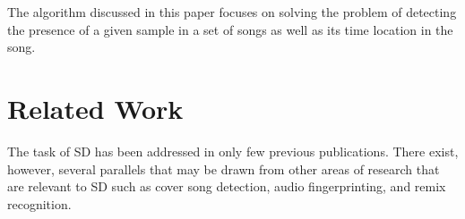 \documentclass{article}
\begin{document}
The algorithm discussed in this paper focuses on solving the problem of detecting the presence of a given sample in a set of songs as well as its time location in the song.

%
\section{Related Work}
\label{related}
The task of SD has been addressed in only few previous publications. There exist, however, several parallels that may be drawn from other areas of research that are relevant to SD such as cover song detection, audio fingerprinting, and remix recognition. %

\end{document}
